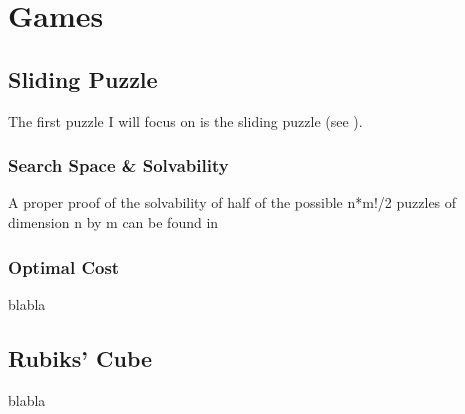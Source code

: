 
\chapter{Games} %

\label{sec:Games} %

\section{Sliding Puzzle}

The first puzzle I will focus on is the sliding puzzle (see \cite{SlidingPuzzle}).





\subsection{Search Space \& Solvability}

A proper proof of the solvability of half of the possible n*m!/2 puzzles of dimension n by m can be found in \cite{Archer1999} 


\subsection{Optimal Cost}

blabla



\section{Rubiks' Cube}

blabla

